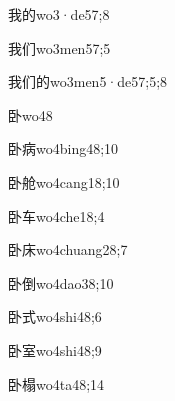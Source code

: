 \begin{verbete}{我的}{wo3·de5}{7;8}
\end{verbete}

\begin{verbete}{我们}{wo3men5}{7;5}
\end{verbete}

\begin{verbete}{我们的}{wo3men5·de5}{7;5;8}
\end{verbete}

\begin{verbete}{卧}{wo4}{8}
\end{verbete}

\begin{verbete}{卧病}{wo4bing4}{8;10}
\end{verbete}

\begin{verbete}{卧舱}{wo4cang1}{8;10}
\end{verbete}

\begin{verbete}{卧车}{wo4che1}{8;4}
\end{verbete}

\begin{verbete}{卧床}{wo4chuang2}{8;7}
\end{verbete}

\begin{verbete}{卧倒}{wo4dao3}{8;10}
\end{verbete}

\begin{verbete}{卧式}{wo4shi4}{8;6}
\end{verbete}

\begin{verbete}{卧室}{wo4shi4}{8;9}
\end{verbete}

\begin{verbete}{卧榻}{wo4ta4}{8;14}
\end{verbete}


